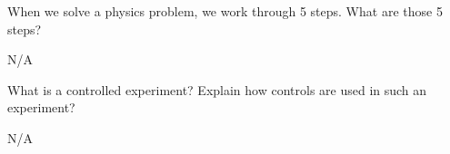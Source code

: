 \begin{question}[ID=IM-Q07,topic=intro,difficulty=C]
    When we solve a physics problem, we work through 5 steps.
    What are those 5 steps?
\end{question}
\begin{solution}
    N/A
\end{solution}


\begin{question}[ID=IM-Q08,topic=intro,difficulty=C]
    What is a controlled experiment?
    Explain how controls are used in such an experiment?
\end{question}
\begin{solution}
    N/A
\end{solution}


\endinput

